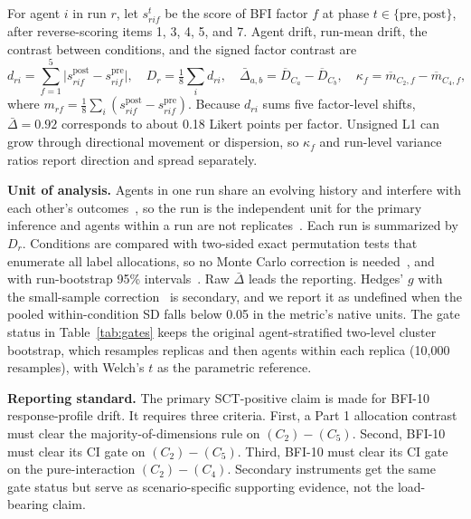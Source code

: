 For agent $i$ in run $r$, let $s_{rif}^{t}$ be the score of BFI factor $f$ at phase $t\in\{\mathrm{pre},\mathrm{post}\}$, after reverse-scoring items 1, 3, 4, 5, and 7. Agent drift, run-mean drift, the contrast between conditions, and the signed factor contrast are
\begin{equation}\label{eq:drift}
 d_{ri}=\sum_{f=1}^{5}\bigl|s_{rif}^{\mathrm{post}}-s_{rif}^{\mathrm{pre}}\bigr|,\quad
 D_r=\tfrac{1}{8}\sum_{i}d_{ri},\quad
 \bar\Delta_{a,b}=\overline D_{C_a}-\overline D_{C_b},\quad
 \kappa_f=\overline m_{C_2,f}-\overline m_{C_4,f},
\end{equation}
where $m_{rf}=\frac{1}{8}\sum_i(s_{rif}^{\mathrm{post}}-s_{rif}^{\mathrm{pre}})$. Because $d_{ri}$ sums five factor-level shifts, $\bar\Delta{=}0.92$ corresponds to about 0.18 Likert points per factor. Unsigned L1 can grow through directional movement or dispersion, so $\kappa_f$ and run-level variance ratios report direction and spread separately.

\textbf{Unit of analysis.} Agents in one run share an evolving history and interfere with each other's outcomes~\citep{Hudgens2008,Aronow2017}, so the run is the independent unit for the primary inference and agents within a run are not replicates~\citep{Hurlbert1984}. Each run is summarized by $D_r$. Conditions are compared with two-sided exact permutation tests that enumerate all label allocations, so no Monte Carlo correction is needed~\citep{Phipson2010}, and with run-bootstrap 95\% intervals~\citep{Efron1979}. Raw $\bar\Delta$ leads the reporting. Hedges' $g$ with the small-sample correction~\citep{Hedges1981} is secondary, and we report it as undefined when the pooled within-condition SD falls below 0.05 in the metric's native units. The gate status in Table~\ref{tab:gates} keeps the original agent-stratified two-level cluster bootstrap, which resamples replicas and then agents within each replica (10{,}000 resamples), with Welch's $t$ as the parametric reference.

\textbf{Reporting standard.} The primary SCT-positive claim is made for BFI-10 response-profile drift. It requires three criteria. First, a Part 1 allocation contrast must clear the majority-of-dimensions rule on $(C_2){-}(C_5)$. Second, BFI-10 must clear its CI gate on $(C_2){-}(C_5)$. Third, BFI-10 must clear its CI gate on the pure-interaction $(C_2){-}(C_4)$. Secondary instruments get the same gate status but serve as scenario-specific supporting evidence, not the load-bearing claim.
